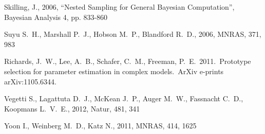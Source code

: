 \documentclass[letterpaper, 11pt]{article}
\begin{document}
\begin{thebibliography}{99}
 Skilling, 
J., 2006, ``Nested Sampling for General Bayesian Computation'', Bayesian 
Analysis 4, pp. 833-860

Suyu S.~H., Marshall P.~J., Hobson M.~P., Blandford R.~D., 2006, MNRAS, 
371, 983 

 Richards, J.~W., Lee, 
A.~B., Schafer, C.~M., Freeman, P.~E.\ 2011.\ Prototype selection for 
parameter estimation in complex models.\ ArXiv e-prints arXiv:1105.6344. 

 Vegetti S., Lagattuta D.~J., McKean J.~P., 
Auger M.~W., Fassnacht C.~D., Koopmans L.~V.~E., 2012, Natur, 481, 341 

 Yoon I., Weinberg M.~D., Katz N., 2011, MNRAS, 414, 1625 
\end{thebibliography}
\end{document}
